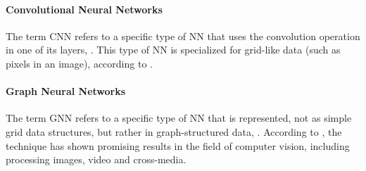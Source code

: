 \paragraph*{Convolutional Neural Networks}

The term \ac{CNN} refers to a specific type of \ac{NN} that uses the convolution operation in one of its layers, \cite{Goodfellow2016}. This type of \ac{NN} is specialized for grid-like data (such as pixels in an image), according to \cite{Goodfellow2016, VALUEVA2020232}.

\paragraph*{Graph Neural Networks}

The term \ac{GNN} refers to a specific type of \ac{NN} that is represented, not as simple grid data structures, but rather in graph-structured data, \cite{GNN2022}. According to \cite{GNN2022}, the technique has shown promising results in the field of computer vision, including processing images, video and cross-media.